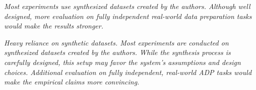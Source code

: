 %
%
%


\begin{shaded}
{
\emph{Most experiments use synthesized datasets created by the authors. Although well designed, more evaluation on fully independent real-world data preparation tasks would make the results stronger.}

\emph{Heavy reliance on synthetic datasets.
Most experiments are conducted on synthesized datasets created by the authors. While the synthesis process is carefully designed, this setup may favor the system's assumptions and design choices. Additional evaluation on fully independent, real-world ADP tasks would make the empirical claims more convincing.}
}
\end{shaded}

